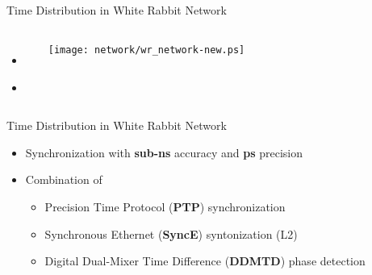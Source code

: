 \documentclass[compress,red]{beamer}
\begin{document}
\subsection{}
\begin{frame}{Time Distribution in White Rabbit Network}


\begin{columns}[c]
 
  \begin{itemize}
    \item \textbf{\color{blue!90}{High accuracy/precision synchronization}}
    \item \color{gray}{Deterministic, reliable and low-latency Control Data delivery}
  \end{itemize}

    \begin{center}
    \texttt{[image: network/wr\_network-new.ps]}
    \end{center}
\end{columns}

\end{frame}
\begin{frame}{Time Distribution in White Rabbit Network}

  \begin{itemize}
    \item Synchronization with {\bf sub-ns} accuracy and {\bf ps} precision
    \item Combination of
	\begin{itemize}
	  \item Precision Time Protocol ({\bf PTP}) synchronization
	  \item Synchronous Ethernet ({\bf SyncE}) syntonization (L2)
	  \item Digital Dual-Mixer Time Difference ({\bf DDMTD}) phase detection
	\end{itemize}
  \end{itemize}
\end{frame}
\end{document}

